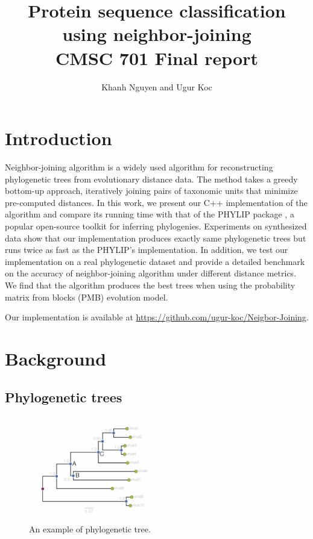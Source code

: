 \documentclass[11pt,letterpaper]{article}
\title{
Protein sequence classification using neighbor-joining\\
   CMSC 701 Final report
}
\author{
	Khanh Nguyen and Ugur Koc
}
\theoremstyle{definition}
\begin{document}
\maketitle

\section{Introduction}

Neighbor-joining algorithm \cite{saitou1987neighbor} is a widely used algorithm for reconstructing phylogenetic trees from evolutionary distance data. The method takes a greedy bottom-up approach, iteratively joining pairs of taxonomic units that minimize pre-computed distances. In this work, we present our C++ implementation of the algorithm and compare its running time with that of the PHYLIP package \cite{felsenstein2005phylip}, a popular open-source toolkit for inferring phylogenies. Experiments on synthesized data show that our implementation produces exactly same phylogenetic trees but runs twice as fast as the PHYLIP's implementation. In addition, we test our implementation on a real phylogenetic dataset and provide a detailed benchmark on the accuracy of neighbor-joining algorithm under different distance metrics. We find that the algorithm produces the best trees when using the probability matrix from blocks (PMB) evolution model.

Our implementation is available at \url{https://github.com/ugur-koc/Neigbor-Joining}.

\section{Background}


\subsection{Phylogenetic trees}

\begin{figure}[t]
  \centering
  \includegraphics[width=0.5\textwidth]{phylogram_1a.png}
  \caption{An example of phylogenetic tree.}
  \label{fig:phytree}
\end{figure}
\end{document}
